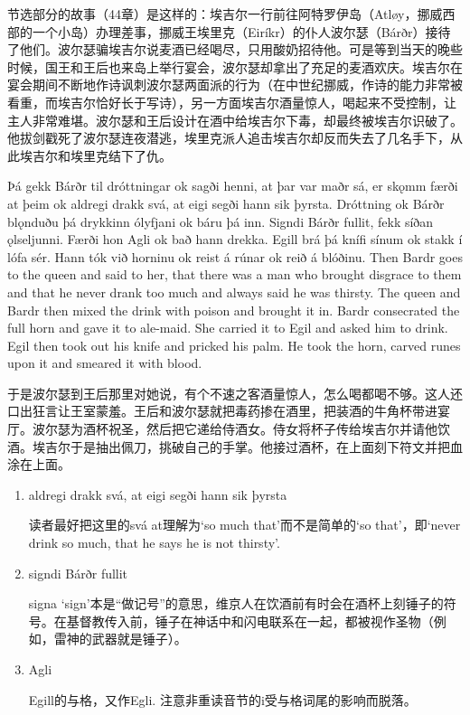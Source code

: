 节选部分的故事（44章）是这样的：埃吉尔一行前往阿特罗伊岛（Atløy，挪威西部的一个小岛）办理差事，挪威王埃里克（Eiríkr）的仆人波尔瑟（Bárðr）接待了他们。波尔瑟骗埃吉尔说麦酒已经喝尽，只用酸奶招待他。可是等到当天的晚些时候，国王和王后也来岛上举行宴会，波尔瑟却拿出了充足的麦酒欢庆。埃吉尔在宴会期间不断地作诗讽刺波尔瑟两面派的行为（在中世纪挪威，作诗的能力非常被看重，而埃吉尔恰好长于写诗），另一方面埃吉尔酒量惊人，喝起来不受控制，让主人非常难堪。波尔瑟和王后设计在酒中给埃吉尔下毒，却最终被埃吉尔识破了。他拔剑戳死了波尔瑟连夜潜逃，埃里克派人追击埃吉尔却反而失去了几名手下，从此埃吉尔和埃里克结下了仇。
\begin{paracol}{2}
    Þá gekk Bárðr til dróttningar ok sagði henni, at þar var maðr sá, er skǫmm færði at þeim ok aldregi drakk svá, at eigi segði hann sik þyrsta. Dróttning ok Bárðr blǫnduðu þá drykkinn ólyfjani ok báru þá inn. Signdi Bárðr fullit, fekk síðan ǫlseljunni. Færði hon Agli ok bað hann drekka. Egill brá þá knífi sínum ok stakk í lófa sér. Hann tók við horninu ok reist á rúnar ok reið á blóðinu.
    \switchcolumn
    Then Bardr goes to the queen and said to her, that there was a man who brought disgrace to them and that he never drank too much and always said he was thirsty. The queen and Bardr then mixed the drink with poison and brought it in. Bardr consecrated the full horn and gave it to ale-maid. She carried it to Egil and asked him to drink. Egil then took out his knife and pricked his palm. He took the horn, carved runes upon it and smeared it with blood.
\end{paracol}
\begin{translation*}{}
    于是波尔瑟到王后那里对她说，有个不速之客酒量惊人，怎么喝都喝不够。这人还口出狂言让王室蒙羞。王后和波尔瑟就把毒药掺在酒里，把装酒的牛角杯带进宴厅。波尔瑟为酒杯祝圣，然后把它递给侍酒女。侍女将杯子传给埃吉尔并请他饮酒。埃吉尔于是抽出佩刀，挑破自己的手掌。他接过酒杯，在上面刻下符文并把血涂在上面。
\end{translation*}
\begin{grammar*}{}
    \begin{enumerate}[leftmargin=*]
        \item aldregi drakk svá, at eigi segði hann sik þyrsta

              读者最好把这里的svá at理解为`so much that'而不是简单的`so that'，即`never drink so much, that he says he is not thirsty'.
        \item signdi Bárðr fullit

              signa `sign'本是“做记号”的意思，维京人在饮酒前有时会在酒杯上刻锤子的符号。在基督教传入前，锤子在神话中和闪电联系在一起，都被视作圣物（例如，雷神的武器就是锤子）。
        \item Agli

              Egill的与格，又作Egli. 注意非重读音节的i受与格词尾的影响而脱落。
    \end{enumerate}
\end{grammar*}
